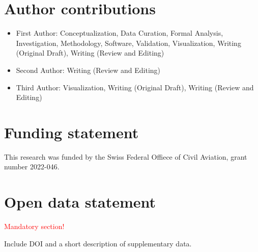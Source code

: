 \documentclass[
  manuscript=proceedings,  %
  layout=preprint,  %
  year=20xx,
  volume=x,
]{extra/joas}
\begin{document}
\section*{Author contributions}

\begin{itemize}
  \item First Author: Conceptualization, Data Curation, Formal Analysis, Investigation, Methodology, Software, Validation, Visualization, Writing (Original Draft), Writing (Review and Editing)
  \item Second Author: Writing (Review and Editing)
  \item Third Author: Visualization, Writing (Original Draft), Writing (Review and Editing)
\end{itemize}


\section*{Funding statement}
This research was funded by the Swiss Federal Offiece of Civil Aviation, grant number 2022-046.

\section*{Open data statement}
\textcolor{red}{Mandatory section!}

Include DOI and a short description of supplementary data.

\end{document}
